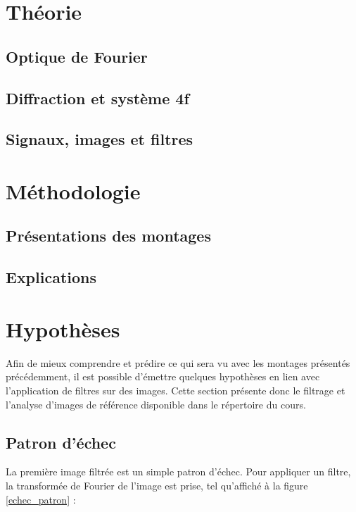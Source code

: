 \documentclass[11pt,letterpaper]{article}
\begin{document}
\section{Théorie}

\subsection{Optique de Fourier}

\subsection{Diffraction et système 4f}

\subsection{Signaux, images et filtres}

\section{Méthodologie}

\subsection{Présentations des montages}

\subsection{Explications}

\section{Hypothèses}

Afin de mieux comprendre et prédire ce qui sera vu avec les montages présentés précédemment, il est possible d'émettre quelques hypothèses en lien avec l'application de filtres sur des images. Cette section présente donc le filtrage et l'analyse d'images de référence disponible dans le répertoire du cours.

\subsection{Patron d'échec}

La première image filtrée est un simple patron d'échec. Pour appliquer un filtre, la transformée de Fourier de l'image est prise, tel qu'affiché à la figure \ref{echec_patron} :
\end{document}
